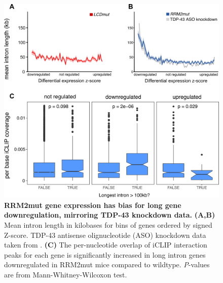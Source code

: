 \begin{figure}[h]
	\centering
	\includegraphics[width=12cm]{Figures/05_tdp_mice/long_genes_multi.png}
	\caption[RRM2mut gene expression has bias for long gene downregulation]{
		\textbf{RRM2mut gene expression has bias for long gene downregulation, mirroring TDP-43 knockdown data.}
	\textbf{(A,B)} Mean intron length in kilobases for bins of genes ordered by signed Z-score. TDP-43 antisense olignucleotide (ASO) knockdown data taken from \cite{Polymenidou2011}. \textbf{(C)} The per-nucleotide overlap of iCLIP interaction peaks for each gene is significantly increased in long intron genes downregulated in RRM2mut mice compared to wildtype. \textit{P}-values are from Mann-Whitney-Wilcoxon test.
}
	\label{fig:long_genes}
\end{figure}

